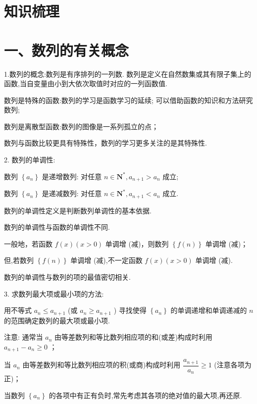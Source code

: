 \section*{知识梳理}

\section*{一、数列的有关概念}

1.数列的概念:数列是有序排列的一列数. 数列是定义在自然数集或其有限子集上的函数,当自变量由小到大依次取值时对应的一列函数值.

  数列是特殊的函数:数列的学习是函数学习的延续; 可以借助函数的知识和方法研究数列;

  数列是离散型函数:数列的图像是一系列孤立的点；

  数列与函数比较更具有特殊性，数列的学习更多关注的是其特殊性.

2. 数列的单调性:

数列 $\left\{  {a}_{n}\right\}$ 是递增数列: 对任意 $n \in  {\mathbf{N}}^{ * },{a}_{n + 1} > {a}_{n}$ 成立;

数列 $\left\{  {a}_{n}\right\}$ 是递减数列: 对任意 $n \in  {\mathbf{N}}^{ * },{a}_{n + 1} < {a}_{n}$ 成立.

  数列的单调性定义是判断数列单调性的基本依据.

  数列的单调性与函数的单调性不同.

一般地，若函数 $f\left( x\right) \left( {x > 0}\right)$ 单调增 (减)，则数列 $\left\{  {f\left( n\right) }\right\}$ 单调增 (减)；

但,若数列 $\left\{  {f\left( n\right) }\right\}$ 单调增 (减),不一定函数 $f\left( x\right) \left( {x > 0}\right)$ 单调增 (减).

  数列的单调性与数列的项的最值密切相关.

3. 求数列最大项或最小项的方法:

用不等式 ${a}_{n} \leq  {a}_{n + 1}$ (或 ${a}_{n} \geq  {a}_{n + 1}$ ) 寻找使得 $\left\{  {a}_{n}\right\}$ 的单调递增和单调递减的 $n$ 的范围确定数列的最大项或最小项.

注意:   通常当 ${a}_{n}$ 由等差数列和等比数列相应项的和(或差)构成时利用 ${a}_{n + 1} - {a}_{n} \geq  0$ ；

   当 ${a}_{n}$ 由等差数列和等比数列相应项的积(或商)构成时利用 $\dfrac{{a}_{n + 1}}{{a}_{n}} \geq  1$ (注意各项为正)；

   当数列 $\left\{  {a}_{n}\right\}$ 的各项中有正有负时,常先考虑其各项的绝对值的最大项,再还原.

